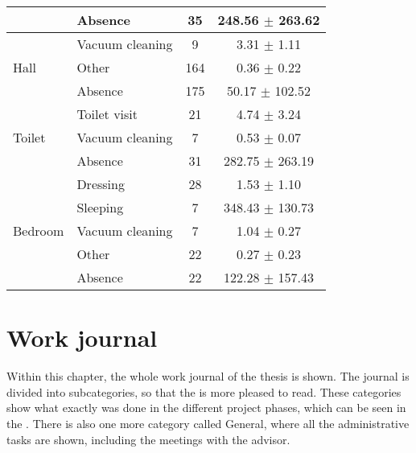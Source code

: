 \begin{table}[htbp]
\begin{tabular}{l|l|c|c}
        \cline{2-4}
        & Absence & 35 & 248.56 $\pm$ 263.62 \\
        \midrule[1pt]
        \multirow{3}{*}{Hall} & Vacuum cleaning & 9 & 3.31 $\pm$ 1.11 \\
        \cline{2-4}
        & Other & 164 & 0.36 $\pm$ 0.22 \\
        \cline{2-4}
        & Absence & 175 & 50.17 $\pm$ 102.52 \\
        \midrule[1pt]
        \multirow{3}{*}{Toilet} & Toilet visit & 21 & 4.74 $\pm$ 3.24 \\
        \cline{2-4}
        & Vacuum cleaning & 7 & 0.53 $\pm$ 0.07 \\
        \cline{2-4}
        & Absence & 31 & 282.75 $\pm$ 263.19 \\
        \midrule[1pt]
        \multirow{5}{*}{Bedroom} & Dressing & 28 & 1.53 $\pm$ 1.10 \\
        \cline{2-4}
        & Sleeping & 7 & 348.43 $\pm$ 130.73 \\
        \cline{2-4}
        & Vacuum cleaning & 7 & 1.04 $\pm$ 0.27 \\
        \cline{2-4}
        & Other & 22 & 0.27 $\pm$ 0.23 \\
        \cline{2-4}
        & Absence & 22 & 122.28 $\pm$ 157.43 \\
        \bottomrule
    \end{tabular}
\end{table}

\chapter{Work journal}
\label{app:Work-Journal}

Within this chapter, the whole work journal of the thesis is shown. The journal is divided into subcategories, so that the  is more pleased to read. These categories show what exactly was done in the different project phases, which can be seen in the . There is also one more category called \flqq General\frqq, where all the administrative tasks are shown, including the meetings with the advisor.

\clearpage
\landscapevalues

